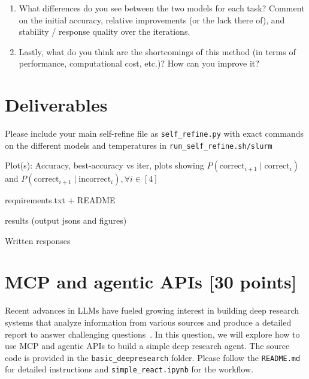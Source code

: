 \documentclass{article}
\begin{document}
\begin{enumerate}
\begin{solve}
    \end{solve}

    \item  What differences do you see between the two models for each task? Comment on the initial accuracy, relative improvements (or the lack there of), and stability / response quality over the iterations.
    \begin{solve}
    
    \end{solve}
    \item Lastly, what do you think are the shortcomings of this method (in terms of performance, computational cost, etc.)? How can you improve it? 
    \begin{solve}
    
    \end{solve}
\end{enumerate}

\section*{Deliverables}
\begin{checklist}
    \item Please include your main self-refine file as \texttt{self\_refine.py} with exact commands on the different models and temperatures in \texttt{run\_self\_refine.sh/slurm}
    \item Plot(s): Accuracy, best-accuracy vs iter, plots showing $P(\text{correct}_{i+1} \mid \text{correct}_{i})$ and $P(\text{correct}_{i+1} \mid \text{incorrect}_{i}), \forall i \in [4]$ 
    \item requirements.txt + README
    \item results (output jsons and figures)
    \item Written responses 
\end{checklist}

\clearpage
\section{MCP and agentic APIs [30 points]}

Recent advances in LLMs have fueled growing interest in building deep research systems that analyze information from various sources and produce a detailed report to answer challenging questions~\cite{geminiGeminiDeep,openaiIntroducingDeep,singh2025ai2,perplexity2025deepresearch}. In this question, we will explore how to use MCP and agentic APIs to build a simple deep research agent. The source code is provided in the \texttt{basic\_deepresearch} folder. Please follow the \texttt{README.md} for detailed instructions and \texttt{simple\_react.ipynb} for the workflow.
\end{document}
